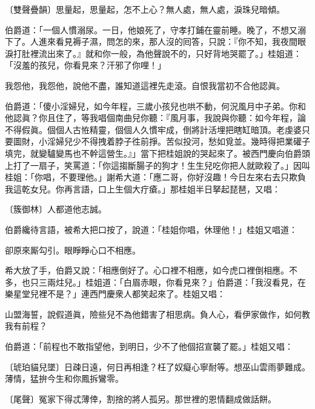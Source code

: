 \begin{myquote} 
{\markfont\small〔雙聲疊韻〕}思量起，思量起，怎不上心？無人處，無人處，淚珠兒暗傾。
\end{myquote} 

伯爵道：「一個人慣溺尿。一日，他娘死了，守孝打鋪在靈前睡。晚了，不想又溺下了。人進來看見褥子濕，問怎的來，那人沒的囘答，只說：『你不知，我夜間眼淚打肚裡流出來了。』就和你一般，為他聲說不的，只好背地哭罷了。」桂姐道：「沒羞的孩兒，你看見來？汗邪了你哩！」

\begin{myquote}
我怨他，我怨他，說他不盡，誰知道這裡先走滾。自恨我當初不合他認眞。
\end{myquote}

伯爵道：「傻小淫婦兒，如今年程，三歲小孩兒也哄不動，何況風月中子弟。你和他認眞？你且住了，等我唱個南曲兒你聽：『風月事，我說與你聽：如今年程，論不得假眞。個個人古恠精靈，個個人久慣牢成，倒將計活埋把瞎缸暗頂。老虔婆只要圖財，小淫婦兒少不得拽着脖子徃前掙。苦似投河，愁如覓並。幾時得把業礶子填完，就變驢變馬也不幹這營生。』」當下把桂姐說的哭起來了。{}被西門慶向伯爵頭上打了一扇子，笑罵道：「你這搊斷腸子的狗才！生生兒吃你把人就歐殺了。」因叫桂姐：「你唱，不要理他。」謝希大道：「應二哥，你好沒趣！今日左來右去只欺負我這乾女兒。你再言語，口上生個大疔瘡。」那桂姐半日拏起琵琶，又唱：

\begin{myquote}
{\markfont\small〔簇御林〕}人都道他志誠。
\end{myquote}

伯爵纔待言語，被希大把口按了，{}說道：「桂姐你唱，休理他！」桂姐又唱道：

\begin{myquote}
卻原來厮勾引。眼睜睜心口不相應。
\end{myquote}

希大放了手，伯爵又說：「相應倒好了。心口裡不相應，如今虎口裡倒相應。不多，也只三兩炷兒。」桂姐道：「白眉赤眼，你看見來？」伯爵道：「我沒看見，在樂星堂兒裡不是？」連西門慶衆人都笑起來了。桂姐又唱：

\begin{myquote}
山盟海誓，說假道眞，險些兒不為他錯害了相思病。負人心，看伊家做作，如何教我有前程？
\end{myquote}

伯爵道：「前程也不敢指望他，到明日，少不了他個招宣襲了罷。」桂姐又唱：

\begin{myquote}
{\markfont\small〔琥珀貓兒墜〕}日疎日遠，何日再相逢？枉了奴癡心寧耐等。想巫山雲雨夢難成。薄情，猛拚今生和你鳳拆鸞零。

{\markfont\small〔尾聲〕}冤家下得忒薄倖，割捨的將人孤另。那世裡的恩情翻成做話餅。
\end{myquote}

